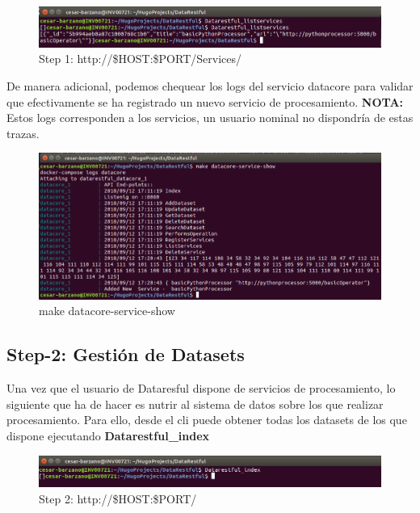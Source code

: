 \documentclass[a4paper,11pt]{book}
\begin{document}
\begin{figure}[H]  
\centering 
\includegraphics[scale=0.35]{imagenes/list_services2.png}
\caption{ Step 1: http://\$HOST:\$PORT/Services/  }  
\end{figure} 

De manera adicional, podemos chequear los logs del servicio datacore para validar que efectivamente se ha registrado un nuevo servicio de procesamiento. \textbf{NOTA:} Estos logs corresponden a los servicios, un usuario nominal no dispondría de estas trazas. 

\begin{figure}[H]  
\centering 
\includegraphics[scale=0.35]{imagenes/add_service.png}
\caption{ make datacore-service-show }  
\end{figure} 

\subsection{Step-2: Gestión de Datasets}

Una vez que el usuario de Dataresful dispone de servicios de procesamiento, lo siguiente que ha de hacer es nutrir al sistema de datos sobre los que realizar procesamiento. Para ello, desde el cli puede obtener todas los datasets de los que dispone ejecutando \textbf{Datarestful\_index}

\begin{figure}[H]  
\centering 
\includegraphics[scale=0.35]{imagenes/index.png}
\caption{ Step 2: http://\$HOST:\$PORT/   }  
\end{figure} 
\end{document}
